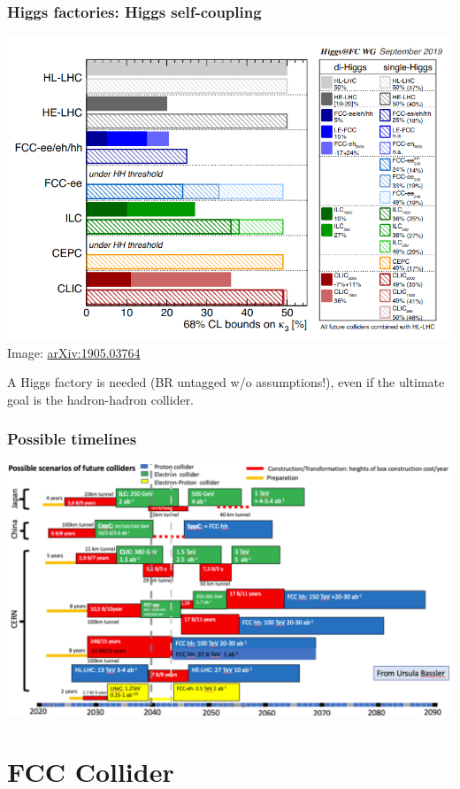 \documentclass[aspectratio=169]{beamer}
\begin{document}
\begin{frame}
  \frametitle{Higgs factories: Higgs self-coupling}

  \begin{center}
    \includegraphics[width=0.6\linewidth]{figures/higgs_selfCoupling.png}\\
    \tiny{Image: \href{https://arxiv.org/abs/1905.03764}{arXiv:1905.03764}}
  \end{center}
  \pause

  A Higgs factory is needed (BR untagged w/o assumptions!), even if the ultimate
  goal is the hadron-hadron collider.\\
\end{frame}


\begin{frame}
  \frametitle{Possible timelines}
  \begin{center}
    \includegraphics[width=0.8\linewidth]{figures/timeline-EPPSU2020.png}\\
  \end{center}
\end{frame}

%
%
\section{FCC Collider}
\end{document}
